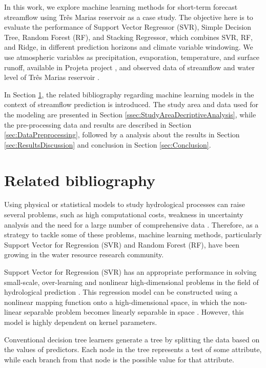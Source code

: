 \documentclass[12pt]{article}
\begin{document}
In this work, we explore machine learning methods for short-term forecast streamflow using Três Marias reservoir as a case study. The objective here is to evaluate the performance of Support Vector Regressor (SVR), Simple Decision Tree, Random Forest (RF), and Stacking Regressor, which combines SVR, RF, and Ridge, in different prediction horizons and climate variable windowing. We use atmospheric variables as precipitation, evaporation, temperature, and surface runoff, available in Projeta project \cite{inpe}, and observed data of streamflow and water level of Três Marias reservoir \cite{onsnivel,onsvazao}.

In Section \ref{sec:RelatedBibliography}, the related bibliography regarding machine learning models in the context of streamflow prediction is introduced. The study area and data used for the modeling are presented in Section \ref{ssec:StudyAreaDecriptiveAnalysis}, while the pre-processing data and results are described in Section \ref{sec:DataPreprocessing}, followed by a analysis about the results in Section \ref{sec:ResultsDiscussion} and conclusion in Section \ref{sec:Conclusion}.

\section{Related bibliography}
\label{sec:RelatedBibliography}

Using physical or statistical models to study hydrological processes can raise several problems, such as high computational costs, weakness in uncertainty analysis and the need for a large number of comprehensive data \cite{ardabili2019deep}. Therefore, as a strategy to tackle some of these problems, machine learning methods, particularly Support Vector for Regression (SVR) and Random Forest (RF), have been growing in the water resource research community.

Support Vector for Regression (SVR) has an appropriate performance in solving small-scale, over-learning and nonlinear high-dimensional problems in the field of hydrological prediction \cite{xu,wang}. This regression model can be constructed using a nonlinear mapping function onto a high-dimensional space, in which the non-linear separable problem becomes linearly separable in space \cite{maity}. However, this model is highly dependent on kernel parameters.

Conventional decision tree learners generate a tree by splitting the data based on the values of predictors. Each node in the tree represents a test of some attribute, while each branch from that node is the possible value for that attribute.
\end{document}
